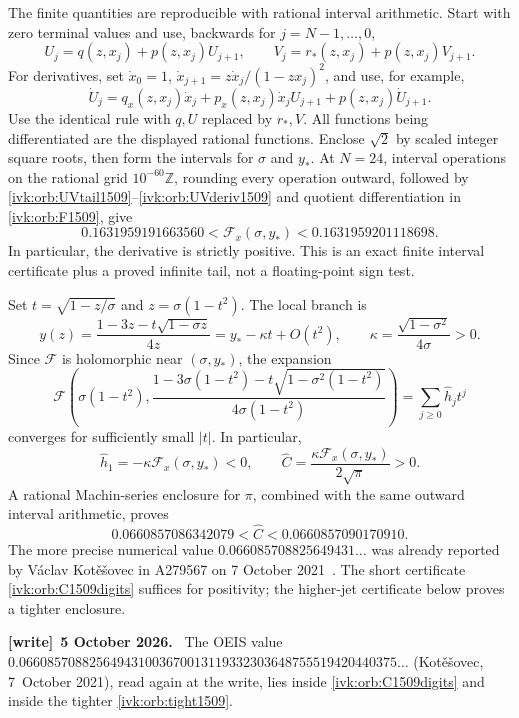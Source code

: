 \documentclass[11pt,letterpaper]{article}
\theoremstyle{remark}\newtheorem{remark}[theorem]{Remark}
\newenvironment{writenote}[1][]{\par\smallskip\begingroup\small
 \noindent\textbf{[write]}\if\relax\detokenize{#1}\relax\else~\textbf{#1.}\fi\ }%
 {\par\endgroup\smallskip}
\begin{document}
The finite quantities are reproducible with rational interval arithmetic.
Start with zero terminal values and use, backwards for $j=N-1,\ldots,0$,
\[
U_j=q(z,x_j)+p(z,x_j)U_{j+1},\qquad
V_j=r_*(z,x_j)+p(z,x_j)V_{j+1}.
\]
For derivatives, set $\dot x_0=1$,
$\dot x_{j+1}=z\dot x_j/(1-zx_j)^2$, and use, for example,
\[
\dot U_j=q_x(z,x_j)\dot x_j+
 p_x(z,x_j)\dot x_j U_{j+1}+p(z,x_j)\dot U_{j+1}.
\]
Use the identical rule with $q,U$ replaced by $r_*,V$.
All functions being differentiated are the displayed rational functions.
Enclose $\sqrt2$ by scaled integer square roots, then form the intervals
for $\sigma$ and $y_*$. At $N=24$, interval operations on the rational
grid $10^{-60}\mathbb Z$, rounding every operation outward, followed by
\eqref{ivk:orb:UVtail1509}--\eqref{ivk:orb:UVderiv1509} and quotient differentiation in
\eqref{ivk:orb:F1509}, give
\begin{equation}\label{ivk:orb:Fx1509}
0.1631959191663560<\mathcal F_x(\sigma,y_*)
<0.1631959201118698.
\end{equation}
In particular, the derivative is strictly positive. This is an exact
finite interval certificate plus a proved infinite tail, not a
floating-point sign test.

Set $t=\sqrt{1-z/\sigma}$ and $z=\sigma(1-t^2)$. The local branch is
\begin{equation}\label{ivk:orb:local1509}
y(z)=\frac{1-3z-t\sqrt{1-\sigma z}}{4z}
=y_*-\kappa t+O(t^2),\qquad
\kappa=\frac{\sqrt{1-\sigma^2}}{4\sigma}>0.
\end{equation}
Since $\mathcal F$ is holomorphic near $(\sigma,y_*)$, the expansion
\begin{equation}\label{ivk:orb:Blocal1509}
\mathcal F\left(\sigma(1-t^2),
\frac{1-3\sigma(1-t^2)-t\sqrt{1-\sigma^2(1-t^2)}}{4\sigma(1-t^2)}
\right)=\sum_{j\ge0}\widehat h_j t^j
\end{equation}
converges for sufficiently small $|t|$. In particular,
\begin{equation}\label{ivk:orb:C1509}
\widehat h_1=-\kappa\mathcal F_x(\sigma,y_*)<0,\qquad
\widehat C=\frac{\kappa\mathcal F_x(\sigma,y_*)}{2\sqrt\pi}>0.
\end{equation}
A rational Machin-series enclosure for $\pi$, combined with the same
outward interval arithmetic, proves
\begin{equation}\label{ivk:orb:C1509digits}
0.0660857086342079<\widehat C<0.0660857090170910.
\end{equation}
The more precise numerical value $0.066085708825649431\ldots$ was
already reported by V\'aclav Kot\v{e}\v{s}ovec in A279567 on
7 October 2021~\cite{oeis1509}. The short certificate \eqref{ivk:orb:C1509digits} suffices for positivity;
the higher-jet certificate below proves a tighter enclosure.
\begin{writenote}[5 October 2026]
The OEIS value $0.066085708825649431003670\allowbreak013119332303648755519\allowbreak420440375\ldots$ (Kot\v{e}\v{s}ovec, 7~October 2021), read again at the write, lies inside \eqref{ivk:orb:C1509digits} and inside the tighter \eqref{ivk:orb:tight1509}.
\end{writenote}
\end{document}
